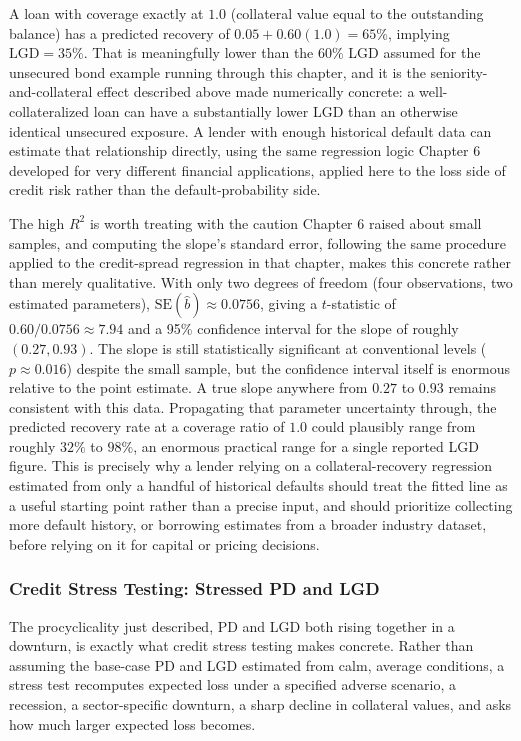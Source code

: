 \documentclass[../ai_in_finance]{subfiles}
\begin{document}
A loan with coverage exactly at $1.0$ (collateral value equal to the outstanding balance) has a predicted recovery of $0.05+0.60(1.0)=65\%$, implying $\text{LGD}=35\%$. That is meaningfully lower than the $60\%$ LGD assumed for the unsecured bond example running through this chapter, and it is the seniority-and-collateral effect described above made numerically concrete: a well-collateralized loan can have a substantially lower LGD than an otherwise identical unsecured exposure. A lender with enough historical default data can estimate that relationship directly, using the same regression logic Chapter 6 developed for very different financial applications, applied here to the loss side of credit risk rather than the default-probability side.

The high $R^2$ is worth treating with the caution Chapter 6 raised about small samples, and computing the slope's standard error, following the same procedure applied to the credit-spread regression in that chapter, makes this concrete rather than merely qualitative. With only two degrees of freedom (four observations, two estimated parameters), $\text{SE}(\hat b) \approx 0.0756$, giving a $t$-statistic of $0.60/0.0756 \approx 7.94$ and a 95\% confidence interval for the slope of roughly $(0.27, 0.93)$.
The slope is still statistically significant at conventional levels ($p\approx0.016$) despite the small sample, but the confidence interval itself is enormous relative to the point estimate. A true slope anywhere from $0.27$ to $0.93$ remains consistent with this data. Propagating that parameter uncertainty through, the predicted recovery rate at a coverage ratio of $1.0$ could plausibly range from roughly $32\%$ to $98\%$, an enormous practical range for a single reported LGD figure.
This is precisely why a lender relying on a collateral-recovery regression estimated from only a handful of historical defaults should treat the fitted line as a useful starting point rather than a precise input, and should prioritize collecting more default history, or borrowing estimates from a broader industry dataset, before relying on it for capital or pricing decisions.

\subsubsection*{Credit Stress Testing: Stressed PD and LGD}
\label{sec:credit-stress-testing}

The procyclicality just described, PD and LGD both rising together in a downturn, is exactly what credit stress testing makes concrete. Rather than assuming the base-case PD and LGD estimated from calm, average conditions, a stress test recomputes expected loss under a specified adverse scenario, a recession, a sector-specific downturn, a sharp decline in collateral values, and asks how much larger expected loss becomes.
\end{document}
